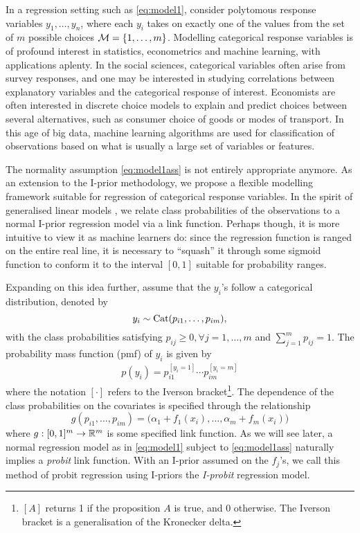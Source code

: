 \documentclass[a4paper,showframe,11pt]{report}
\begin{document}

In a regression setting such as \cref{eq:model1}, consider polytomous response variables $y_1,\dots,y_n$, where each $y_i$ takes on exactly one of the values from the set of $m$ possible choices ${\mathcal M} = \{1,\dots,m\}$.
Modelling categorical response variables is of profound interest in statistics, econometrics and machine learning, with applications aplenty. 
In the social sciences, categorical variables often arise from survey responses, and one may be interested in studying correlations between  explanatory variables and the categorical response of interest.
Economists are often interested in discrete choice models to explain and predict choices between several alternatives, such as consumer choice of goods or modes of transport.
In this age of big data, machine learning algorithms are used for classification of observations based on what is usually a large set of variables or features.

The normality assumption \cref{eq:model1ass} is not entirely appropriate anymore.
As an extension to the I-prior methodology, we propose a flexible modelling framework suitable for regression of categorical response variables.
In the spirit of generalised linear models \citep{mccullagh1989}, we relate class probabilities of the observations to a normal I-prior regression model via a link function.
Perhaps though, it is more intuitive to view it as machine learners do: since the regression function is ranged on the entire real line, it is necessary to ``squash'' it through some sigmoid function to conform it to the interval $[0,1]$ suitable for probability ranges.

Expanding on this idea further, assume that the $y_i$'s follow a categorical distribution, denoted by
\[
  y_i \sim \operatorname{Cat}(p_{i1},\dots,p_{im}),
\]
with the class probabilities satisfying $p_{ij} \geq 0, \forall j=1,\dots,m$ and $\sum_{j=1}^m p_{ij} = 1$. 
The probability mass function (pmf) of $y_i$ is given by
\begin{align*}%
  p(y_i) = p_{i1}^{[y_i = 1]} \cdots p_{im}^{[y_i = m]}
\end{align*}
where the notation $[\cdot]$ refers to the Iverson bracket\footnote{$[A]$ returns 1 if the proposition $A$ is true, and 0 otherwise. The Iverson bracket is a generalisation of the Kronecker delta.}. 
The dependence of the class probabilities on the covariates is specified through the relationship
\[
  g(p_{i1},\dots,p_{im}) = \big(\alpha_1 + f_1(x_i), \dots, \alpha_m + f_m(x_i)\big)
\]
where $g:[0,1]^m\to\mathbb{R}^m$ is some specified link function.
As we will see later, a normal regression model as in \cref{eq:model1} subject to \cref{eq:model1ass} naturally implies a \emph{probit} link function.
With an I-prior assumed on the $f_j$'s, we call this method of probit regression using I-priors the \emph{I-probit} regression model.
\end{document}
